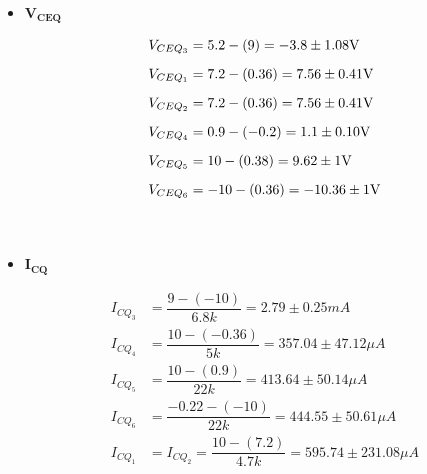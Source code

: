 \begin{enumerate}
        \begin{itemize}
          \item $\mathbf{V_{CEQ}}$

                \begin{align*}
                  V_{CEQ_3} & =5.2-(9)=-3.8 \pm 1.08\volt    \\[0.2cm]
                  V_{CEQ_1} & =7.2-(0.36)=7.56 \pm 0.41\volt \\[0.2cm]
                  V_{CEQ_2} & =7.2-(0.36)=7.56 \pm 0.41\volt \\[0.2cm]
                  V_{CEQ_4} & =0.9-(-0.2)=1.1 \pm 0.10\volt  \\[0.2cm]
                  V_{CEQ_5} & =10-(0.38)=9.62 \pm 1\volt     \\[0.2cm]
                  V_{CEQ_6} & =-10-(0.36)=-10.36 \pm 1\volt  \\[1cm]
                \end{align*}


          \item $\mathbf{I_{CQ}}$

                \begin{align*}
                  I_{CQ_3} & =\dfrac{9-(-10)}{6.8k}=2.79 \pm 0.25 mA                   \\[0.2cm]
                  I_{CQ_4} & =\dfrac{10-(-0.36)}{5k}=357.04 \pm 47.12\mu A             \\[0.2cm]
                  I_{CQ_5} & =\dfrac{10-(0.9)}{22k}=413.64 \pm 50.14\mu A              \\[0.2cm]
                  I_{CQ_6} & =\dfrac{-0.22-(-10)}{22k}=444.55 \pm 50.61\mu A           \\[0.2cm]
                  I_{CQ_1} & = I_{CQ_2}=\dfrac{10-(7.2)}{4.7k}=595.74 \pm 231.08 \mu A \\[1cm]
                \end{align*}




\end{itemize}
\end{enumerate}
